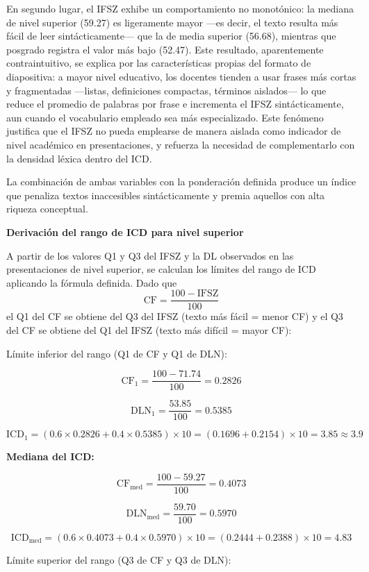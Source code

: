 \documentclass[11pt]{article}
\begin{document}
En segundo lugar, el IFSZ exhibe un comportamiento no monotónico: la mediana de nivel superior (59.27) es ligeramente mayor —es decir, el texto resulta más fácil de leer sintácticamente— que la de media superior (56.68), mientras que posgrado registra el valor más bajo (52.47). Este resultado, aparentemente contraintuitivo, se explica por las características propias del formato de diapositiva: a mayor nivel educativo, los docentes tienden a usar frases más cortas y fragmentadas —listas, definiciones compactas, términos aislados— lo que reduce el promedio de palabras por frase e incrementa el IFSZ sintácticamente, aun cuando el vocabulario empleado sea más especializado. Este fenómeno justifica que el IFSZ no pueda emplearse de manera aislada como indicador de nivel académico en presentaciones, y refuerza la necesidad de complementarlo con la densidad léxica dentro del ICD.

La combinación de ambas variables con la ponderación definida produce un índice que penaliza textos inaccesibles sintácticamente y premia aquellos con alta riqueza conceptual.

\textbf{Derivación del rango de ICD para nivel superior}

A partir de los valores Q1 y Q3 del IFSZ y la DL observados en las presentaciones de nivel superior, se calculan los límites del rango de ICD aplicando la fórmula definida. Dado que
\[
\mathrm{CF} = \frac{100 - \mathrm{IFSZ}}{100}
\]
el Q1 del CF se obtiene del Q3 del IFSZ (texto más fácil = menor CF) y el Q3 del CF se obtiene del Q1 del IFSZ (texto más difícil = mayor CF):

Límite inferior del rango (Q1 de CF y Q1 de DLN):

\[
\mathrm{CF}_1 = \frac{100 - 71.74}{100} = 0.2826
\]

\[
\mathrm{DLN}_1 = \frac{53.85}{100} = 0.5385
\]

\[
\mathrm{ICD}_1 = (0.6 \times 0.2826 + 0.4 \times 0.5385) \times 10 = (0.1696 + 0.2154) \times 10 = 3.85 \approx 3.9
\]

\textbf{Mediana del ICD:}

\[
\mathrm{CF}_{\mathrm{med}} = \frac{100 - 59.27}{100} = 0.4073
\]

\[
\mathrm{DLN}_{\mathrm{med}} = \frac{59.70}{100} = 0.5970
\]

\[
\mathrm{ICD}_{\mathrm{med}} = (0.6 \times 0.4073 + 0.4 \times 0.5970) \times 10 = (0.2444 + 0.2388) \times 10 = 4.83
\]

Límite superior del rango (Q3 de CF y Q3 de DLN):
\end{document}
